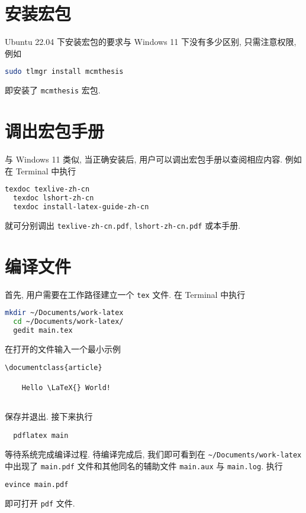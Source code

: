 \section{安装宏包}\label{sec:ubuntu:installpackage}

Ubuntu 22.04 下安装宏包的要求与 Windows 11 下没有多少区别, 只需注意权限, 例如
\begin{lstlisting}[language = bash]
  sudo tlmgr install mcmthesis
\end{lstlisting}
即安装了 \texttt{mcmthesis} 宏包.

\section{调出宏包手册}\label{sec:ubuntu:texdoc}

与 Windows 11 类似,
当正确安装后,
用户可以调出宏包手册以查阅相应内容.
例如在 \textsf{Terminal} 中执行
\begin{lstlisting}[language=bash]
  texdoc texlive-zh-cn
  texdoc lshort-zh-cn
  texdoc install-latex-guide-zh-cn
\end{lstlisting}
就可分别调出 \texttt{texlive-zh-cn.pdf},
\texttt{lshort-zh-cn.pdf}
或本手册.

\section{编译文件}

首先, 用户需要在工作路径建立一个 \texttt{tex} 文件.
在 \textsf{Terminal} 中执行
\begin{lstlisting}[language = bash]
  mkdir ~/Documents/work-latex
  cd ~/Documents/work-latex/
  gedit main.tex
\end{lstlisting}
在打开的文件输入一个最小示例
\begin{lstlisting}[language = {[LaTeX]TeX}]
  \documentclass{article}
  
    Hello \LaTeX{} World!
  
\end{lstlisting}
保存并退出. 
接下来执行
\begin{lstlisting}
  pdflatex main
\end{lstlisting}
等待系统完成编译过程. 
待编译完成后,
我们即可看到在 \texttt{\~{}/Documents/work-latex} 中出现了
\texttt{main.pdf} 文件和其他同名的辅助文件 \texttt{main.aux} 与
\texttt{main.log}. 
执行
\begin{lstlisting}[language=bash]
  evince main.pdf
\end{lstlisting}
即可打开 \texttt{pdf} 文件.

